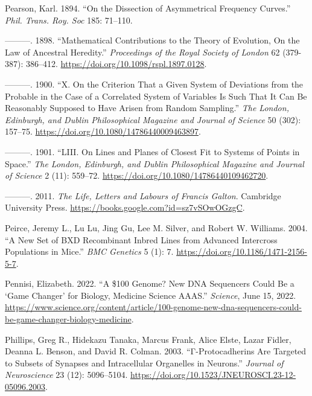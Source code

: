 \documentclass[
]{book}
\newlength{\cslhangindent}
\newlength{\cslentryspacingunit} %
\newenvironment{CSLReferences}[2] %
 {%
  \setlength{\parindent}{0pt}
  \ifodd #1
  \let\oldpar\par
  \def\par{\hangindent=\cslhangindent\oldpar}
  \fi
  \setlength{\parskip}{#2\cslentryspacingunit}
 }%
 {}
\begin{document}
\begin{CSLReferences}{1}{0}
\leavevmode{}%
Pearson, Karl. 1894. {``On the Dissection of Asymmetrical Frequency Curves.''} \emph{Phil. Trans. Roy. Soc} 185: 71--110.

\leavevmode{}%
---------. 1898. {``Mathematical Contributions to the Theory of Evolution, {On} the Law of Ancestral Heredity.''} \emph{Proceedings of the Royal Society of London} 62 (379-387): 386--412. \url{https://doi.org/10.1098/rspl.1897.0128}.

\leavevmode{}%
---------. 1900. {``X. {On} the Criterion That a Given System of Deviations from the Probable in the Case of a Correlated System of Variables Is Such That It Can Be Reasonably Supposed to Have Arisen from Random Sampling.''} \emph{The London, Edinburgh, and Dublin Philosophical Magazine and Journal of Science} 50 (302): 157--75. \url{https://doi.org/10.1080/14786440009463897}.

\leavevmode{}%
---------. 1901. {``{LIII}. {On} Lines and Planes of Closest Fit to Systems of Points in Space.''} \emph{The London, Edinburgh, and Dublin Philosophical Magazine and Journal of Science} 2 (11): 559--72. \url{https://doi.org/10.1080/14786440109462720}.

\leavevmode{}%
---------. 2011. \emph{The {Life}, {Letters} and {Labours} of {Francis Galton}}. {Cambridge University Press}. \url{https://books.google.com?id=sz7vSOwOGzgC}.

\leavevmode{}%
Peirce, Jeremy L., Lu Lu, Jing Gu, Lee M. Silver, and Robert W. Williams. 2004. {``A New Set of {BXD} Recombinant Inbred Lines from Advanced Intercross Populations in Mice.''} \emph{BMC Genetics} 5 (1): 7. \url{https://doi.org/10.1186/1471-2156-5-7}.

\leavevmode{}%
Pennisi, Elizabeth. 2022. {``A \$100 Genome? {New DNA} Sequencers Could Be a {`Game Changer'} for Biology, Medicine \textbar{} {Science} \textbar{} {AAAS}.''} \emph{Science}, June 15, 2022. \url{https://www.science.org/content/article/100-genome-new-dna-sequencers-could-be-game-changer-biology-medicine}.

\leavevmode{}%
Phillips, Greg R., Hidekazu Tanaka, Marcus Frank, Alice Elste, Lazar Fidler, Deanna L. Benson, and David R. Colman. 2003. {``Γ-{Protocadherins Are Targeted} to {Subsets} of {Synapses} and {Intracellular Organelles} in {Neurons}.''} \emph{Journal of Neuroscience} 23 (12): 5096--5104. \url{https://doi.org/10.1523/JNEUROSCI.23-12-05096.2003}.


\end{CSLReferences}
\end{document}
